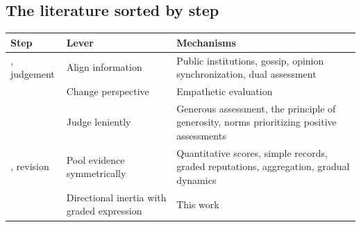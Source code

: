 \documentclass[11pt]{article}
\begin{document}
\subsection*{The literature sorted by step}
\begin{center}\small
\begin{tabularx}{\linewidth}{@{}>{\raggedright\arraybackslash}p{3.2cm} >{\raggedright\arraybackslash}p{4.2cm} L@{}}
\toprule
Step & Lever & Mechanisms \\
, judgement & Align information & Public institutions\cite{radzvilavicius2021}, gossip\cite{sommerfeld2007,kawakatsu2024}, opinion synchronization\cite{murase2024synchronization}, dual assessment\cite{tham2026} \\
 & Change perspective & Empathetic evaluation\cite{radzvilavicius2019} \\
 & Judge leniently & Generous assessment\cite{schmid2021}, the principle of generosity\cite{okada2020dilemmas}, norms prioritizing positive assessments\cite{okada2024} \\
, revision & Pool evidence symmetrically & Quantitative scores\cite{schmid2023}, simple records\cite{clark2020}, graded reputations\cite{tanabe2013,murase2022}, aggregation\cite{michelmata2024}, gradual dynamics\cite{yamamoto2025} \\
 & Directional inertia with graded expression & This work \\
\bottomrule
\end{tabularx}
\end{center}
\end{document}
